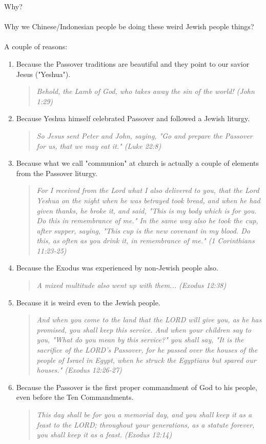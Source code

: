 \documentclass[10pt,oneside,footinclude=true,headinclude=true]{scrbook} %
\newcommand\quot[1]{
	\begin{quote}\textit{\small#1}\end{quote}
}
\begin{document}
Why?\\
\\
Why we Chinese/Indonesian people be doing these weird Jewish people things?\\
\\
A couple of reasons:
\begin{enumerate}
	\item{
		Because the Passover traditions are beautiful and they point to our savior Jesus ("Yeshua").
		\quot{Behold, the Lamb of God, who takes away the sin of the world! (John 1:29)}
	}
	\item{
		Because Yeshua himself celebrated Passover and followed a Jewish liturgy.
		\quot{So Jesus sent Peter and John, saying, "Go and prepare the Passover for us, that we may eat it." (Luke 22:8)}
	}
	\item{
		Because what we call "communion" at church is actually a couple of elements from the Passover liturgy.
		\quot{For I received from the Lord what I also delivered to you, that the Lord Yeshua on the night when he was betrayed took bread, and when he had given thanks, he broke it, and said, "This is my body which is for you. Do this in remembrance of me." In the same way also he took the cup, after supper, saying, "This cup is the new covenant in my blood. Do this, as often as you drink it, in remembrance of me." (1 Corinthians 11:23-25)}
	}
	\item{
		Because the Exodus was experienced by non-Jewish people also.
		\quot{A mixed multitude also went up with them... (Exodus 12:38)}
	}
	\item{
		Because it is weird even to the Jewish people.
		\quot{And when you come to the land that the LORD will give you, as he has promised, you shall keep this service. And when your children say to you, "What do you mean by this service?" you shall say, "It is the sacrifice of the LORD's Passover, for he passed over the houses of the people of Israel in Egypt, when he struck the Egyptians but spared our houses." (Exodus 12:26-27)}
	}
	\item{
		Because the Passover is the first proper commandment of God to his people, even before the Ten Commandments.
		\quot{This day shall be for you a memorial day, and you shall keep it as a feast to the LORD; throughout your generations, as a statute forever, you shall keep it as a feast. (Exodus 12:14)}
	}
\end{enumerate}
\end{document}
